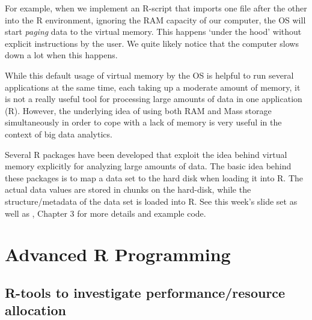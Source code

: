 \documentclass[
  12pt,
]{style/krantz}
\begin{document}
For example, when we implement an R-script that imports one file after the other into the R environment, ignoring the RAM capacity of our computer, the OS will start \emph{paging} data to the virtual memory. This happens `under the hood' without explicit instructions by the user. We quite likely notice that the computer slows down a lot when this happens.

While this default usage of virtual memory by the OS is helpful to run several applications at the same time, each taking up a moderate amount of memory, it is not a really useful tool for processing large amounts of data in one application (R). However, the underlying idea of using both RAM and Mass storage simultaneously in order to cope with a lack of memory is very useful in the context of big data analytics.

Several R packages have been developed that exploit the idea behind virtual memory explicitly for analyzing large amounts of data. The basic idea behind these packages is to map a data set to the hard disk when loading it into R. The actual data values are stored in chunks on the hard-disk, while the structure/metadata of the data set is loaded into R. See this week's slide set as well as \citet{walkowiak_2016}, Chapter 3 for more details and example code.

\hypertarget{advanced-r-programming}{%
\chapter{Advanced R Programming}\label{advanced-r-programming}}

\hypertarget{r-tools-to-investigate-performanceresource-allocation}{%
\section{R-tools to investigate performance/resource allocation}\label{r-tools-to-investigate-performanceresource-allocation}}
\end{document}
